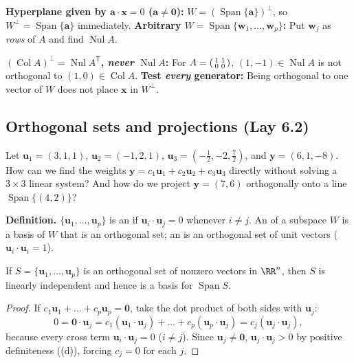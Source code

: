\documentclass[10pt]{scrartcl}
\newcommand{\vv}[1]{\mathbf{#1}}
\DeclareMathOperator{\spn}{Span}\DeclareMathOperator{\Nul}{Nul}\DeclareMathOperator{\Col}{Col}\DeclareMathOperator{\Row}{Row}\DeclareMathOperator{\tr}{tr}\DeclareMathOperator{\proj}{proj}\DeclareMathOperator{\dist}{dist}
\begin{document}
\begin{shortcuts}
  \ii \textbf{Hyperplane given by $\vv a\cdot\vv x=0$ ($\vv a\neq\vv 0$):} $W=(\spn\{\vv a\})^\perp$, so $W^\perp=\spn\{\vv a\}$ immediately.
  \ii \textbf{Arbitrary $W=\spn\{\vv w_1,\dots,\vv w_p\}$:} Put $\vv w_j$ as \emph{rows} of $A$ and find $\Nul A$.
\end{shortcuts}

\begin{trapbox}
  \ii \textbf{$(\Col A)^\perp = \Nul A^{\mathsf T}$, \emph{never} $\Nul A$:} For $A=\begin{psmallmatrix}1&1\\0&0\end{psmallmatrix}$, $(1,-1)\in\Nul A$ is not orthogonal to $(1,0)\in\Col A$.
  \ii \textbf{Test \emph{every} generator:} Being orthogonal to one vector of $W$ does not place $\vv x$ in $W^\perp$.
\end{trapbox}

\subsection{Orthogonal sets and projections (Lay 6.2)}

\begin{qbox}
  Let $\vv u_1=(3,1,1)$, $\vv u_2=(-1,2,1)$, $\vv u_3=(-\frac12,-2,\frac72)$, and $\vv y=(6,1,-8)$. How can we find the weights $\vv y=c_1\vv u_1+c_2\vv u_2+c_3\vv u_3$ directly without solving a $3\times3$ linear system? And how do we project $\vv y=(7,6)$ orthogonally onto a line $\spn\{(4,2)\}$?
\end{qbox}

\noindent\textbf{Definition.} $\{\vv u_1,\dots,\vv u_p\}$ is an  if $\vv u_i\cdot\vv u_j=0$ whenever $i\ne j$. An  of a subspace $W$ is a basis of $W$ that is an orthogonal set; an  is an orthogonal set of unit vectors ($\vv u_i\cdot\vv u_i=1$).

\begin{theorem*}
  If $S=\{\vv u_1,\dots,\vv u_p\}$ is an orthogonal set of nonzero vectors in $\RR^n$, then $S$ is linearly independent and hence is a basis for $\spn S$.
\end{theorem*}
\begin{proof}
  If $c_1\vv u_1+\dots+c_p\vv u_p=\vv 0$, take the dot product of both sides with $\vv u_j$:
  \[
    0 = \vv 0\cdot\vv u_j = c_1(\vv u_1\cdot\vv u_j)+\dots+c_p(\vv u_p\cdot\vv u_j) = c_j(\vv u_j\cdot\vv u_j),
  \]
  because every cross term $\vv u_i\cdot\vv u_j=0$ ($i\ne j$). Since $\vv u_j\neq\vv 0$, $\vv u_j\cdot\vv u_j>0$ by positive definiteness ((d)), forcing $c_j=0$ for each $j$.
\end{proof}
\end{document}
